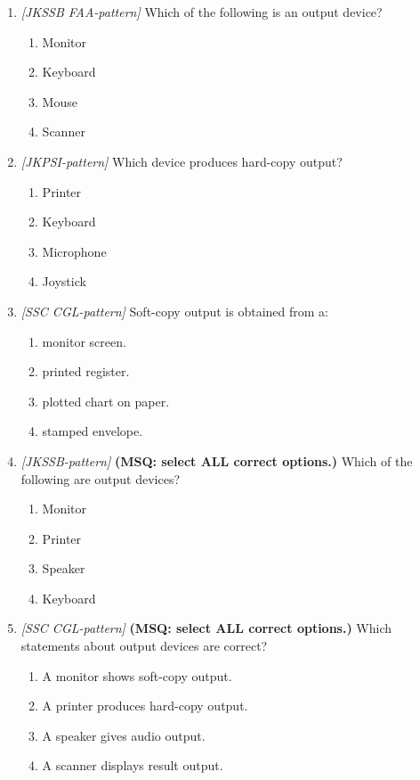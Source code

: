 \documentclass[11pt]{article}
\begin{document}
\begin{enumerate}[label=\textbf{Q\arabic*.}, leftmargin=*]
\item \textit{[JKSSB FAA-pattern]} Which of the following is an output device?
  \begin{enumerate}[label=\Alph*.]
    \item Monitor
    \item Keyboard
    \item Mouse
    \item Scanner
  \end{enumerate}
\item \textit{[JKPSI-pattern]} Which device produces hard-copy output?
  \begin{enumerate}[label=\Alph*.]
    \item Printer
    \item Keyboard
    \item Microphone
    \item Joystick
  \end{enumerate}
\item \textit{[SSC CGL-pattern]} Soft-copy output is obtained from a:
  \begin{enumerate}[label=\Alph*.]
    \item monitor screen.
    \item printed register.
    \item plotted chart on paper.
    \item stamped envelope.
  \end{enumerate}
\item \textit{[JKSSB-pattern]} \textbf{(MSQ: select ALL correct options.)} Which of the following are output devices?
  \begin{enumerate}[label=\Alph*.]
    \item Monitor
    \item Printer
    \item Speaker
    \item Keyboard
  \end{enumerate}
\item \textit{[SSC CGL-pattern]} \textbf{(MSQ: select ALL correct options.)} Which statements about output devices are correct?
  \begin{enumerate}[label=\Alph*.]
    \item A monitor shows soft-copy output.
    \item A printer produces hard-copy output.
    \item A speaker gives audio output.
    \item A scanner displays result output.
  \end{enumerate}
\end{enumerate}
\def\JKSSBLessonID{14}\def\JKSSBAnswers{0}
\end{document}
